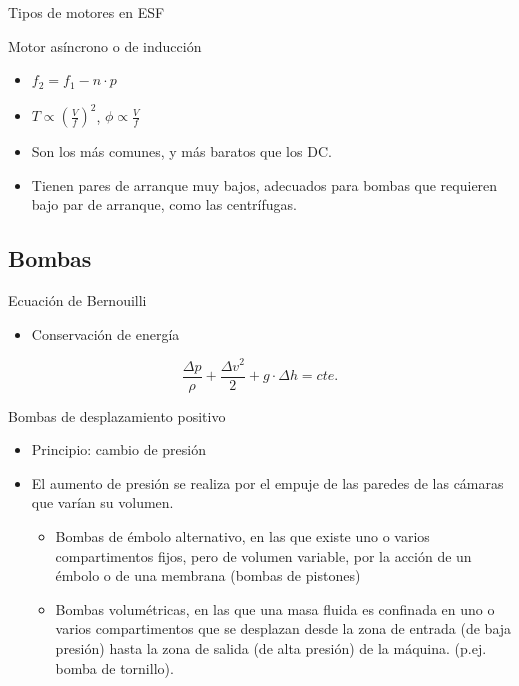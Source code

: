 \documentclass[xcolor={usenames,svgnames,dvipsnames}]{beamer}
\begin{document}
\begin{frame}[label=sec-2-1-8]{Tipos de motores en ESF}
\begin{block}{Motor asíncrono o de inducción}
\begin{itemize}
\item $f_{2}=f_{1}-n\cdot p$

\item $T\propto\left(\frac{V}{f}\right)^{2}$, $\phi\propto\frac{V}{f}$

\item Son los más comunes, y más baratos que los DC.

\item Tienen \alert{pares de arranque muy bajos}, adecuados para bombas que requieren bajo par de arranque, como las \alert{centrífugas}.
\end{itemize}
\end{block}
\end{frame}

\subsection{Bombas}
\label{sec-2-2}

\begin{frame}[label=sec-2-2-1]{Ecuación de Bernouilli}
\begin{itemize}
\item Conservación de energía
\end{itemize}

$$\frac{\Delta p}{\rho}+\frac{\Delta v^2}{2}+g\cdot\Delta h=cte.$$
\end{frame}

\begin{frame}[label=sec-2-2-2]{Bombas de desplazamiento positivo}
\begin{itemize}
\item \alert{Principio}: cambio de presión

\item El aumento de presión se realiza por el empuje de las paredes de las cámaras que varían su volumen.

\begin{itemize}
\item \alert{Bombas de émbolo alternativo}, en las que existe uno o varios compartimentos fijos, pero de volumen variable, por la acción de un émbolo o de una membrana (bombas de pistones)

\item \alert{Bombas volumétricas}, en las que una masa fluida es confinada en uno o varios compartimentos que se desplazan desde la zona de entrada (de baja presión) hasta la zona de salida (de alta presión) de la máquina. (p.ej. bomba de tornillo).
\end{itemize}
\end{itemize}
\end{frame}
\end{document}
